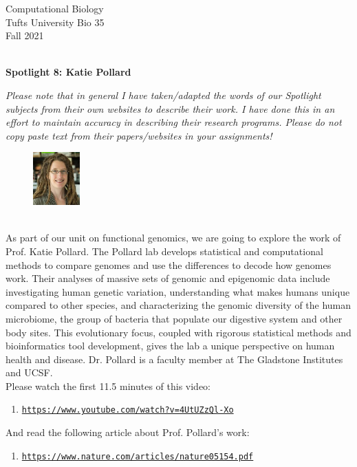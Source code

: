 \documentclass{article}
\begin{document}
\begin{flushright}
Computational Biology ~\\
Tufts University Bio 35 ~\\
Fall 2021 ~\\ ~\\
\end{flushright}
\begin{center}{\textbf{\Large{Spotlight 8: Katie Pollard}}}\end{center}

\textit{Please note that in general I have taken/adapted the words of our Spotlight subjects from their own websites to describe their work. I have done this in an effort to maintain accuracy in describing their research programs. Please do not copy paste text from their papers/websites in your assignments!}

\begin{figure}
\begin{center}
 \includegraphics[width=0.16\textwidth]{images/katie-pollard.jpeg}
 \end{center}
\end{figure}
~\\ As part of our unit on functional genomics, we are going to explore the work of Prof. Katie Pollard. The Pollard lab develops statistical and computational methods to compare genomes and use the differences to decode how genomes work. Their analyses of massive sets of genomic and epigenomic data include investigating human genetic variation, understanding what makes humans unique compared to other species, and characterizing the genomic diversity of the human microbiome, the group of bacteria that populate our digestive system and other body sites. This evolutionary focus, coupled with rigorous statistical methods and bioinformatics tool development, gives the lab a unique perspective on human health and disease. Dr. Pollard is a faculty member at The Gladstone Institutes and UCSF.
~\\ 

Please watch the first 11.5 minutes of this video:
\begin{enumerate}
\item \texttt{\href{https://www.youtube.com/watch?v=4UtUZzQl-Xo}{https://www.youtube.com/watch?v=4UtUZzQl-Xo}}
\end{enumerate}
And read the following article about Prof. Pollard's work: 
\begin{enumerate}
\item \texttt{\href{https://www.nature.com/articles/nature05154.pdf}{https://www.nature.com/articles/nature05154.pdf}}
\end{enumerate}
\end{document}
